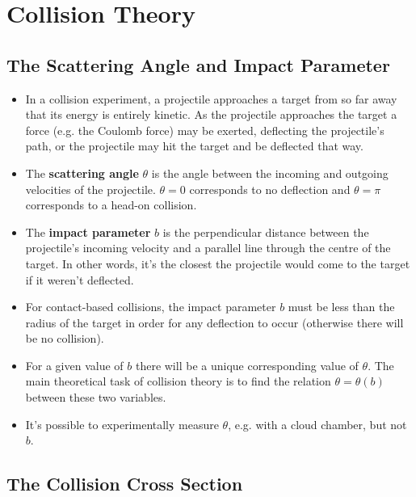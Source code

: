 \documentclass{article}
\begin{document}
\section{Collision Theory}

\subsection{The Scattering Angle and Impact Parameter}

\begin{itemize}
  \item In a collision experiment, a projectile approaches a target from so far away that its energy is entirely kinetic. As the projectile approaches the target a force (e.g. the Coulomb force) may be exerted, deflecting the projectile's path, or the projectile may hit the target and be deflected that way.

  \item The \textbf{scattering angle} $\theta$ is the angle between the incoming and outgoing velocities of the projectile. $\theta = 0$ corresponds to no deflection and $\theta = \pi$ corresponds to a head-on collision.

  \item The \textbf{impact parameter} $b$ is the perpendicular distance between the projectile's incoming velocity and a parallel line through the centre of the target. In other words, it's the closest the projectile would come to the target if it weren't deflected.

  \item For contact-based collisions, the impact parameter $b$ must be less than the radius of the target in order for any deflection to occur (otherwise there will be no collision).

  \item For a given value of $b$ there will be a unique corresponding value of $\theta$. The main theoretical task of collision theory is to find the relation $\theta = \theta(b)$ between these two variables.

  \item It's possible to experimentally measure $\theta$, e.g. with a cloud chamber, but not $b$.
\end{itemize}

\subsection{The Collision Cross Section}
\end{document}
